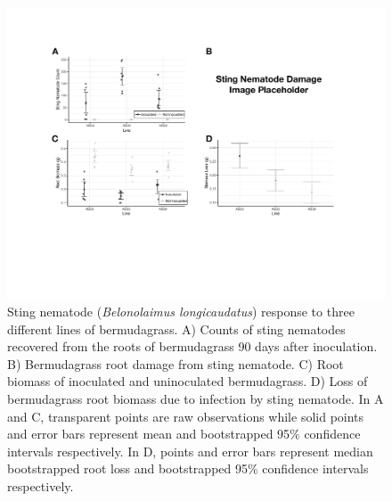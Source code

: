\documentclass[9pt,lineno]{elife}
\begin{document}
\begin{figure}
\begin{fullwidth}
\includegraphics[width=0.95\linewidth]{figures/publication_figures/figure-1.pdf}
\caption{Sting nematode (\textit{Belonolaimus longicaudatus}) response to three different lines of bermudagrass.  A) Counts of sting nematodes recovered from the roots of bermudagrass 90 days after inoculation.  B) Bermudagrass root damage from sting nematode.  C) Root biomass of inoculated and uninoculated bermudagrass.  D) Loss of bermudagrass root biomass due to infection by sting nematode.  In A and C, transparent points are raw observations while solid points and error bars represent mean and bootstrapped 95\% confidence intervals respectively.  In D, points and error bars represent median bootstrapped root loss and bootstrapped 95\% confidence intervals respectively.   }
\label{fig:figure1}
\end{fullwidth}
\end{figure}
\end{document}
